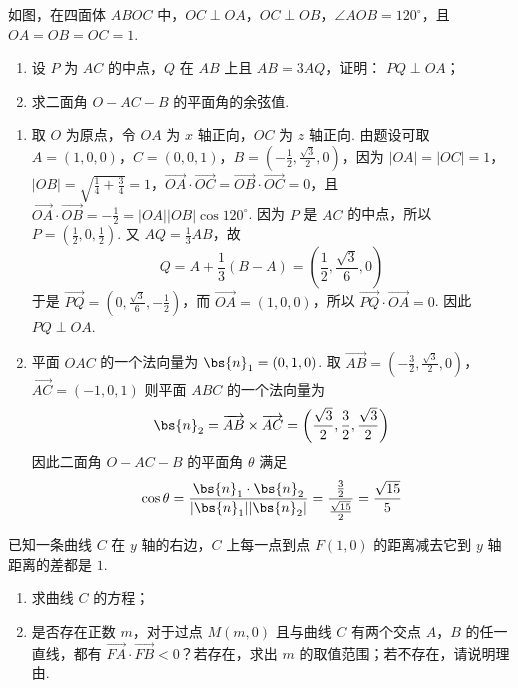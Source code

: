 \begin{problem}
如图，在四面体 \(ABOC\) 中，\(OC \perp OA\)，\(OC \perp OB\)，\(\angle AOB = 120^\circ\)，且 \(OA = OB = OC = 1\).
\begin{enumerate}
\item 设 \(P\) 为 \(AC\) 的中点，\(Q\) 在 \(AB\) 上且 \(AB = 3AQ\)，证明： \(PQ \perp OA\)；
\item 求二面角 \(O - AC - B\) 的平面角的余弦值.
\end{enumerate}
\end{problem}

\begin{solution}
\begin{enumerate}
\item 取 \(O\) 为原点，令 \(OA\) 为 \(x\) 轴正向，\(OC\) 为 \(z\) 轴正向. 由题设可取 \(A=(1,0,0)\)，\(C=(0,0,1)\)，\(B=\left(-\frac12,\frac{\sqrt{3}}2,0\right)\)，因为 \(\lvert OA\rvert=\lvert OC\rvert=1\)，\(\lvert OB\rvert=\sqrt{\frac14+\frac34}=1\)，\(\overrightarrow{OA}\cdot\overrightarrow{OC}=\overrightarrow{OB}\cdot\overrightarrow{OC}=0\)，且 \(\overrightarrow{OA}\cdot\overrightarrow{OB}=-\frac12=\lvert OA\rvert\lvert OB\rvert\cos120^\circ\). 因为 \(P\) 是 \(AC\) 的中点，所以 \(P=\left(\frac12,0,\frac12\right)\). 又 \(AQ=\frac13AB\)，故
\[
Q=A+\frac13(B-A)=\left(\frac12,\frac{\sqrt{3}}6,0\right)
\]
于是 \(\overrightarrow{PQ}=\left(0,\frac{\sqrt{3}}6,-\frac12\right)\)，而 \(\overrightarrow{OA}=(1,0,0)\)，所以 \(\overrightarrow{PQ}\cdot\overrightarrow{OA}=0\). 因此 \(PQ\perp OA\).
\item 平面 \(OAC\) 的一个法向量为 \(\bs{n}_1=(0,1,0)\). 取
\(\overrightarrow{AB}=\left(-\frac32,\frac{\sqrt{3}}2,0\right)\)，\(\overrightarrow{AC}=(-1,0,1)\)
则平面 \(ABC\) 的一个法向量为
\[
\bs{n}_2=\overrightarrow{AB}\times\overrightarrow{AC}
=\left(\frac{\sqrt{3}}2,\frac32,\frac{\sqrt{3}}2\right)
\]
因此二面角 \(O-AC-B\) 的平面角 \(\theta\) 满足
\[
\cos\theta=\frac{\bs{n}_1\cdot\bs{n}_2}{|\bs{n}_1||\bs{n}_2|}
=\frac{\frac{3}{2}}{\frac{\sqrt{15}}{2}}
=\frac{\sqrt{15}}5
\]
\end{enumerate}
\end{solution}

\begin{problem}
已知一条曲线 \(C\) 在 \(y\) 轴的右边，\(C\) 上每一点到点 \(F(1,0)\) 的距离减去它到 \(y\) 轴距离的差都是 \(1\).
\begin{enumerate}
\item 求曲线 \(C\) 的方程；
\item 是否存在正数 \(m\)，对于过点 \(M(m,0)\) 且与曲线 \(C\) 有两个交点 \(A\)，\(B\) 的任一直线，都有 \(\overrightarrow{FA} \cdot \overrightarrow{FB} < 0\)？若存在，求出 \(m\) 的取值范围；若不存在，请说明理由.
\end{enumerate}
\end{problem}

